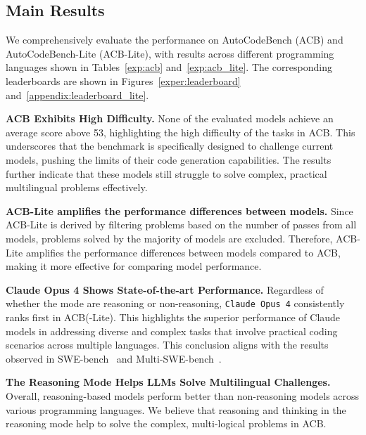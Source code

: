 \subsection{Main Results}

We comprehensively evaluate the performance on AutoCodeBench (ACB) and AutoCodeBench-Lite (ACB-Lite), with results across different programming languages shown in Tables~\ref{exp:acb} and~\ref{exp:acb_lite}. The corresponding leaderboards are shown in Figures~\ref{exper:leaderboard} and~\ref{appendix:leaderboard_lite}.



\textbf{ACB Exhibits High Difficulty.} None of the evaluated models achieve an average score above 53, highlighting the high difficulty of the tasks in ACB. This underscores that the benchmark is specifically designed to challenge current models, pushing the limits of their code generation capabilities. The results further indicate that these models still struggle to solve complex, practical multilingual problems effectively.

\textbf{ACB-Lite amplifies the performance differences between models.} Since ACB-Lite is derived by filtering problems based on the number of passes from all models, problems solved by the majority of models are excluded. Therefore, ACB-Lite amplifies the performance differences between models compared to ACB, making it more effective for comparing model performance.



\textbf{Claude Opus 4 Shows State-of-the-art Performance.} Regardless of whether the mode are reasoning or non-reasoning, \texttt{Claude Opus 4} consistently ranks first in ACB(-Lite). This highlights the superior performance of Claude models in addressing diverse and complex tasks that involve practical coding scenarios across multiple languages. This conclusion aligns with the results observed in SWE-bench~\citep{jimenez2024swebench} and Multi-SWE-bench~\citep{zan2025multiswebenchmultilingualbenchmarkissue}.




\textbf{The Reasoning Mode Helps LLMs Solve Multilingual Challenges.} Overall, reasoning-based models perform better than non-reasoning models across various programming languages. We believe that reasoning and thinking in the reasoning mode help to solve the complex, multi-logical problems in ACB.




